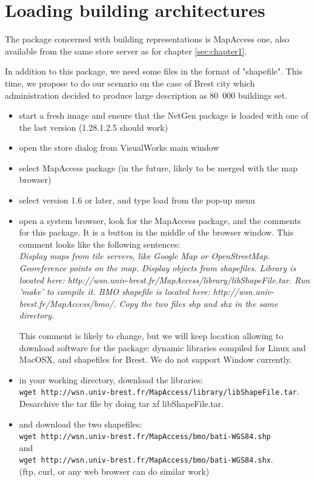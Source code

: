 \section{Loading building architectures}
\label{sec:mapAccess}
The package concerned with building representations is MapAccess one, also available from 
the same store server as for chapter \ref{sec:chapter1}. 

In addition to this package, we need some files in the format of "shapefile". This time, 
we propose to do our scenario on the case of Brest city which administration decided 
to produce large description as 80~000 buildings set. 

\begin{itemize}
\item start a fresh image and ensure that the NetGen package is loaded with one of the last
version (1.28.1.2.5 should work)
\item open the store dialog from VisualWorks main window
\item select MapAccess package (in the future, likely to be merged with the map browser)
\item select version 1.6 or later, and type load from the pop-up menu
\item open a system browser, look for the MapAccess package, and the comments 
for this package. It is a button in the middle of the browser window. 
This comment looks like the following sentences:
\\
\emph{Display maps from tile servers, like Google Map or OpenStreetMap.
Georeference points on the map.
Display objects from shapefiles. 
Library is located here: http://wsn.univ-brest.fr/MapAccess/library/libShapeFile.tar. Run 'make' to compile it. 
BMO shapefile is located here: http://wsn.univ-brest.fr/MapAccess/bmo/. Copy the two files shp and shx in the same directory. 
}

This comment is likely to change, but we will keep location allowing to download 
software for the package: dynamic libraries compiled for Linux and MacOSX, and 
shapefiles for Brest. We do not support Window currently. 

\item in your working directory, download the libraries: \\
\verb!wget http://wsn.univ-brest.fr/MapAccess/library/libShapeFile.tar!. 
\\
Desarchive the tar file by doing tar xf libShapeFile.tar. 
\item and download the two shapefiles: 
\\
\verb!wget http://wsn.univ-brest.fr/MapAccess/bmo/bati-WGS84.shp! 
\\ and \\ 
\verb!wget http://wsn.univ-brest.fr/MapAccess/bmo/bati-WGS84.shx!. 
\\
(ftp, curl, or any web browser can do similar work)
\end{itemize}

